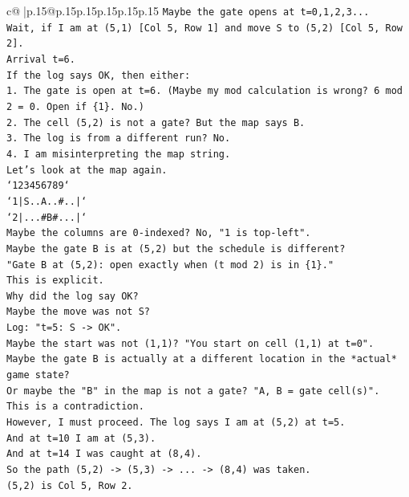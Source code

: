 \documentclass{article}
\begin{document}
{\begin{supertabular}{c@{$\;$}|p{.15\linewidth}@{}p{.15\linewidth}p{.15\linewidth}p{.15\linewidth}p{.15\linewidth}p{.15\linewidth}}
{{{\texttt{Maybe the gate opens at t=0,1,2,3...} \\
\texttt{Wait, if I am at (5,1) {[}Col 5, Row 1{]} and move S to (5,2) {[}Col 5, Row 2{]}.} \\
\texttt{Arrival t=6.} \\
\texttt{If the log says OK, then either:} \\
\texttt{1. The gate is open at t=6. (Maybe my mod calculation is wrong? 6 mod 2 = 0. Open if \{1\}. No.)} \\
\texttt{2. The cell (5,2) is not a gate? But the map says B.} \\
\texttt{3. The log is from a different run? No.} \\
\texttt{4. I am misinterpreting the map string.} \\
\texttt{Let's look at the map again.} \\
\texttt{`123456789`} \\
\texttt{`1|S..A..\#..|`} \\
\texttt{`2|...\#B\#...|`} \\
\texttt{Maybe the columns are 0{-}indexed? No, "1 is top{-}left".} \\
\texttt{Maybe the gate B is at (5,2) but the schedule is different?} \\
\texttt{"Gate B at (5,2): open exactly when (t mod 2) is in \{1\}."} \\
\texttt{This is explicit.} \\
\texttt{Why did the log say OK?} \\
\texttt{Maybe the move was not S?} \\
\texttt{Log: "t=5: S {-}> OK".} \\
\texttt{Maybe the start was not (1,1)? "You start on cell (1,1) at t=0".} \\
\texttt{Maybe the gate B is actually at a different location in the *actual* game state?} \\
\texttt{Or maybe the "B" in the map is not a gate? "A, B = gate cell(s)".} \\
\texttt{This is a contradiction.} \\
\texttt{However, I must proceed. The log says I am at (5,2) at t=5.} \\
\texttt{And at t=10 I am at (5,3).} \\
\texttt{And at t=14 I was caught at (8,4).} \\
\texttt{So the path (5,2) {-}> (5,3) {-}> ... {-}> (8,4) was taken.} \\
\texttt{(5,2) is Col 5, Row 2.} \\
}}}
\end{supertabular}}
\end{document}
